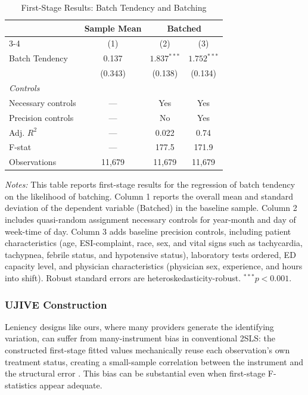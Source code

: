 \documentclass[,,blindrev]{informs}
\begin{document}
\begin{table}[t!]
\centering
\caption{First-Stage Results: Batch Tendency and Batching}
\label{tab:first_stage}
\begin{threeparttable}
\begin{tabular}{p{8cm}ccc}
\toprule
 & Sample Mean & \multicolumn{2}{c}{Batched} \\
\cmidrule(lr){3-4}
 & (1) & (2) & (3) \\
\midrule
Batch Tendency & 0.137 & $1.837^{***}$ & $1.752^{***}$ \\
 & (0.343) & (0.138) & (0.134) \\
\midrule
\textit{Controls} \\
Necessary controls & --- & Yes & Yes \\
Precision controls & --- & No & Yes \\
\midrule
Adj. $R^2$ & --- & 0.022 & 0.74 \\
F-stat & --- & 177.5 & 171.9 \\
Observations & 11,679 & 11,679 & 11,679 \\
\bottomrule
\end{tabular}
\begin{flushleft}
\footnotesize
\textit{Notes:} This table reports first-stage results for the regression of batch tendency on the likelihood of batching. Column 1 reports the overall mean and standard deviation of the dependent variable (Batched) in the baseline sample. Column 2 includes quasi-random assignment necessary controls for year-month and day of week-time of day. Column 3 adds baseline precision controls, including patient characteristics (age, ESI-complaint, race, sex, and vital signs such as tachycardia, tachypnea, febrile status, and hypotensive status), laboratory tests ordered, ED capacity level, and physician characteristics (physician sex, experience, and hours into shift). Robust standard errors are heteroskedasticity-robust.
$^{***} p < 0.001$.
\end{flushleft}
\end{threeparttable}
\end{table}

\subsubsection{UJIVE Construction}\label{sec:ujive}

Leniency designs like ours, where many providers generate the
identifying variation, can suffer from many-instrument bias in
conventional 2SLS: the constructed first-stage fitted values
mechanically reuse each observation's own treatment status, creating a
small-sample correlation between the instrument and the structural error
\citep{kolesar2015manyinvalid, goldsmithpinkham2025leniencydesignsoperatorsmanual}.
This bias can be substantial even when first-stage F-statistics appear
adequate.
\end{document}
